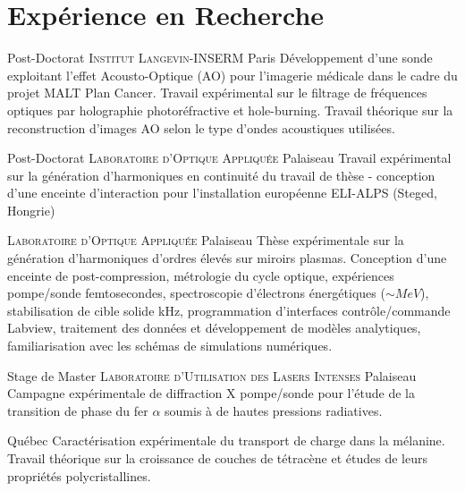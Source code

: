 \documentclass[10pt,a4paper,sans]{moderncv} %
\begin{document}

\section{Expérience en Recherche}


{Post-Doctorat}
{\textsc{Institut Langevin-INSERM}}
{Paris}
{}
{Développement d'une sonde exploitant l'effet Acousto-Optique (AO) pour l'imagerie médicale dans le cadre du projet MALT Plan Cancer. Travail expérimental sur le filtrage de fréquences optiques par holographie photoréfractive et hole-burning. Travail théorique sur la reconstruction d'images AO selon le type d'ondes acoustiques utilisées.}

{Post-Doctorat}
{\textsc{Laboratoire d'Optique Appliquée}}
{Palaiseau}
{}
{Travail expérimental sur la génération d'harmoniques en continuité du travail de thèse - conception d'une enceinte d’interaction pour l'installation européenne ELI-ALPS (Steged, Hongrie)}

{%
\textsc{Laboratoire d'Optique Appliquée}}
{%
Palaiseau}
{}
{%
Thèse expérimentale sur la génération d'harmoniques d'ordres élevés sur miroirs plasmas. Conception d'une enceinte de post-compression, métrologie du cycle optique,  expériences pompe/sonde femtosecondes, spectroscopie d'électrons énergétiques ($\sim MeV$), stabilisation de cible solide kHz, programmation d'interfaces contrôle/commande Labview, traitement des données et développement de modèles analytiques, familiarisation avec les schémas de simulations numériques.
}


{Stage de Master}
{\textsc{Laboratoire d'Utilisation des Lasers Intenses}}
{Palaiseau}
{}
{Campagne expérimentale de diffraction X pompe/sonde pour l'étude de la transition de phase du fer $\alpha$ soumis à de hautes pressions radiatives.}




{Québec}
{}
{Caractérisation expérimentale du transport de charge dans la mélanine. Travail théorique sur la croissance de couches de tétracène et études de leurs propriétés polycristallines.}
\end{document}
